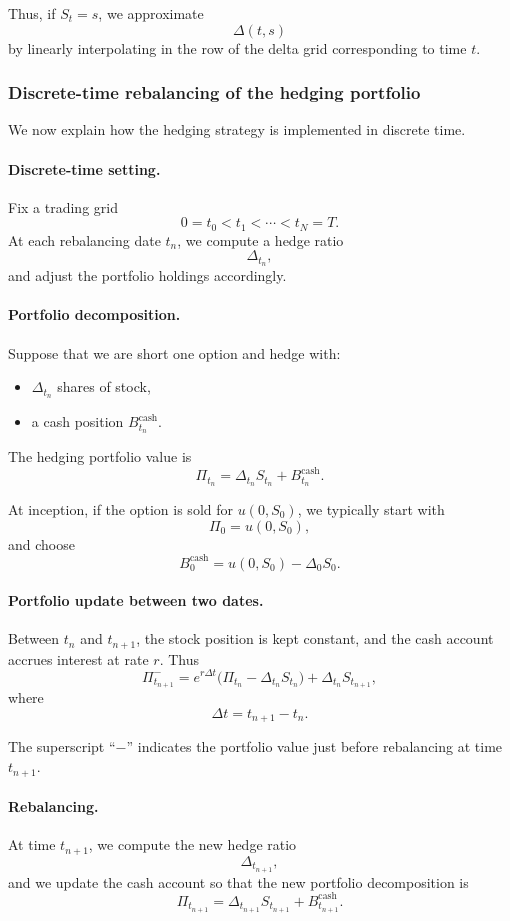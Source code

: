 \documentclass[11pt]{article}
\theoremstyle{plain}
\theoremstyle{definition}
\theoremstyle{remark}
\begin{document}
Thus, if \(S_t=s\), we approximate
\[
\Delta(t,s)
\]
by linearly interpolating in the row of the delta grid corresponding to
time \(t\).

\subsubsection{Discrete-time rebalancing of the hedging portfolio}

We now explain how the hedging strategy is implemented in discrete time.

\paragraph{Discrete-time setting.}
Fix a trading grid
\[
0=t_0<t_1<\cdots<t_N=T.
\]
At each rebalancing date \(t_n\), we compute a hedge ratio
\[
\Delta_{t_n},
\]
and adjust the portfolio holdings accordingly.

\paragraph{Portfolio decomposition.}
Suppose that we are short one option and hedge with:
\begin{itemize}[leftmargin=1.4em]
    \item \(\Delta_{t_n}\) shares of stock,
    \item a cash position \(B_{t_n}^{\mathrm{cash}}\).
\end{itemize}

The hedging portfolio value is
\[
\Pi_{t_n}
=
\Delta_{t_n}S_{t_n}
+
B_{t_n}^{\mathrm{cash}}.
\]

At inception, if the option is sold for \(u(0,S_0)\), we typically start
with
\[
\Pi_0=u(0,S_0),
\]
and choose
\[
B_0^{\mathrm{cash}}=u(0,S_0)-\Delta_0 S_0.
\]

\paragraph{Portfolio update between two dates.}
Between \(t_n\) and \(t_{n+1}\), the stock position is kept constant,
and the cash account accrues interest at rate \(r\).
Thus
\[
\Pi_{t_{n+1}}^{-}
=
e^{r\Delta t}
\big(\Pi_{t_n}-\Delta_{t_n}S_{t_n}\big)
+
\Delta_{t_n}S_{t_{n+1}},
\]
where
\[
\Delta t=t_{n+1}-t_n.
\]

The superscript ``\(-\)'' indicates the portfolio value just before
rebalancing at time \(t_{n+1}\).

\paragraph{Rebalancing.}
At time \(t_{n+1}\), we compute the new hedge ratio
\[
\Delta_{t_{n+1}},
\]
and we update the cash account so that the new portfolio decomposition is
\[
\Pi_{t_{n+1}}
=
\Delta_{t_{n+1}}S_{t_{n+1}}
+
B_{t_{n+1}}^{\mathrm{cash}}.
\]
\end{document}
